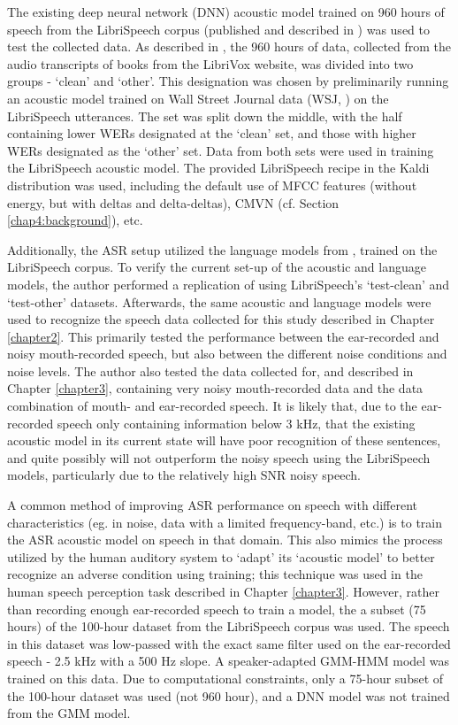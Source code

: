 The existing deep neural network (DNN) acoustic model trained on 960 hours of speech from the LibriSpeech corpus (published and described in \cite{panayotov:15}) was used to test the collected data.  As described in \cite{panayotov:15}, the 960 hours of data, collected from the audio transcripts of books from the LibriVox website, was divided into two groups - `clean' and `other'.  This designation was chosen by preliminarily running an acoustic model trained on Wall Street Journal data (WSJ, \cite{paul:92}) on the LibriSpeech utterances. The set was split down the middle, with the half containing lower WERs designated at the `clean' set, and those with higher WERs designated as the `other' set.  Data from both sets were used in training the LibriSpeech acoustic model.  The provided LibriSpeech recipe in the Kaldi distribution was used, including the default use of MFCC features (without energy, but with deltas and delta-deltas), CMVN (cf. Section \ref{chap4:background}), etc.

Additionally, the ASR setup utilized the language models from \cite{panayotov:15}, trained on the LibriSpeech corpus.  To verify the current set-up of the acoustic and language models, the author performed a replication of \cite{panayotov:15} using LibriSpeech's `test-clean' and `test-other' datasets.  Afterwards, the same acoustic and language models were used to recognize the speech data collected for this study described in Chapter \ref{chapter2}. This primarily tested the performance between the ear-recorded and noisy mouth-recorded speech, but also between the different noise conditions and noise levels.  The author also tested the data collected for, and described in Chapter \ref{chapter3}, containing very noisy mouth-recorded data and the data combination of mouth- and ear-recorded speech.
It is likely that, due to the ear-recorded speech only containing information below 3 kHz, that the existing acoustic model in its current state will have poor recognition of these sentences, and quite possibly will not outperform the noisy speech using the LibriSpeech models, particularly due to the relatively high SNR noisy speech.

A common method of improving ASR performance on speech with different characteristics (eg. in noise, data with a limited frequency-band, etc.) is to train the ASR acoustic model on speech in that domain.  This also mimics the process utilized by the human auditory system to `adapt' its `acoustic model' to better recognize an adverse condition using training; this technique was used in the human speech perception task described in Chapter \ref{chapter3}.  However, rather than recording enough ear-recorded speech to train a model, the a subset (75 hours) of the 100-hour dataset from the LibriSpeech corpus was used.  The speech in this dataset was low-passed with the exact same filter used on the ear-recorded speech - 2.5 kHz with a 500 Hz slope.  A speaker-adapted GMM-HMM model was trained on this data.  Due to computational constraints, only a 75-hour subset of the 100-hour dataset was used (not 960 hour), and a DNN model was not trained from the GMM model.


